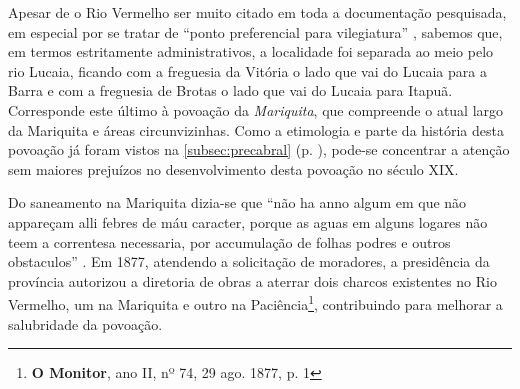 
Apesar de o Rio Vermelho ser muito citado em toda a documentação pesquisada, em especial por se tratar de ``ponto preferencial para vilegiatura'' \cite[p.~597]{ruy_politica_1949}, sabemos que, em termos estritamente administrativos, a localidade foi separada ao meio pelo rio Lucaia, ficando com a freguesia da Vitória o lado que vai do Lucaia para a Barra e com a freguesia de Brotas o lado que vai do Lucaia para Itapuã. Corresponde este último à povoação da \textit{Mariquita}, que compreende o atual largo da Mariquita e áreas circunvizinhas. Como a etimologia e parte da história desta povoação já foram vistos na \autoref{subsec:precabral} (p. \pageref{subsec:precabral}), pode-se concentrar a atenção sem maiores prejuízos no desenvolvimento desta povoação no século XIX.

Do saneamento na Mariquita dizia-se que ``não ha anno algum em que não appareçam alli febres de máu caracter, porque as aguas em alguns logares não teem a correntesa necessaria, por accumulação de folhas podres e outros obstaculos'' \cite[p.~20]{bahia_relatassleg_1873}. Em 1877, atendendo a solicitação de moradores, a presidência da província autorizou a diretoria de obras a aterrar dois charcos existentes no Rio Vermelho, um na Mariquita e outro na Paciência\footnote{\textbf{O Monitor}, ano II, nº 74, 29 ago. 1877, p. 1}, contribuindo para melhorar a salubridade da povoação.

